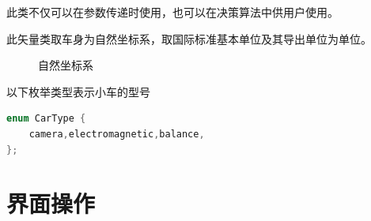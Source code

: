 \documentclass[titlepage,a4paper]{ctexart}
\begin{document}
此类不仅可以在参数传递时使用，也可以在决策算法中供用户使用。

此矢量类取车身为自然坐标系，取国际标准基本单位及其导出单位为单位。
\begin{figure}[!htbp]
\hypertarget{coord}{}%
\centering
{}
\caption{自然坐标系}
\end{figure}

以下枚举类型表示小车的型号
\begin{lstlisting}[language=C++]
enum CarType {
	camera,electromagnetic,balance,
};
\end{lstlisting}
\newpage
\section{界面操作}
\end{document}
